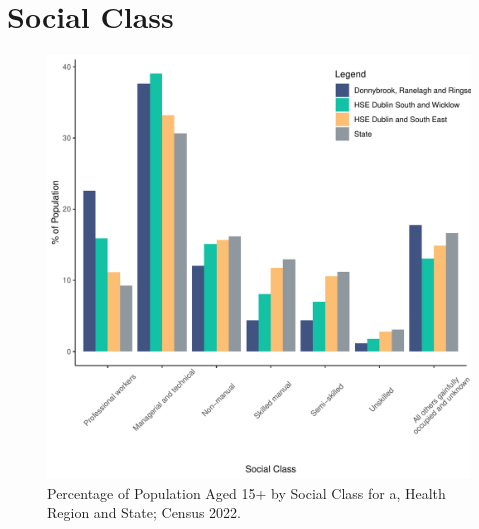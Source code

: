 \documentclass{article}
\begin{document}
\section{Social Class}\label{sect:SC}
\begin{figure}[H]
	\centering
	\includegraphics[width = 140mm]{../figures/SocialClassED.pdf}
	\caption{Percentage of Population Aged 15+ by Social Class for a, Health Region and State; Census 2022.}
	\label{fig:vbnv}
	\end{figure}
\end{document}
